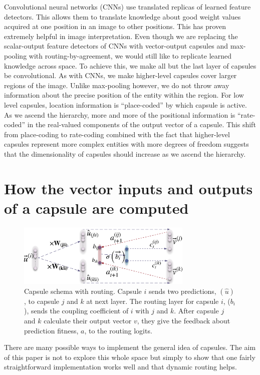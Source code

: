 \documentclass{article}
\begin{document}
Convolutional neural networks (CNNs) use translated replicas of learned feature detectors. This allows them to translate knowledge about good weight values acquired at one position in an image to other positions.  This has proven extremely helpful in image interpretation.  Even though we are replacing the scalar-output feature detectors of CNNs with vector-output capsules and max-pooling with routing-by-agreement, we would still like to replicate learned knowledge across space. To achieve this, we make all but the last layer of capsules be convolutional. As with CNNs, we make higher-level capsules cover larger regions of the image. Unlike max-pooling however, we do not throw away information about the precise position of the entity within the region.  For low level capsules, location information is ``place-coded'' by which capsule is active.  As we ascend the hierarchy, more and more of the positional information is ``rate-coded'' in the real-valued components of the output vector of a capsule. This shift from place-coding to rate-coding combined with the fact that higher-level capsules represent more complex entities with more degrees of freedom suggests that the dimensionality of capsules should increase as we ascend the hierarchy. 

\section{How the vector inputs and outputs of a capsule are computed}
\begin{figure}[t]

  \caption{Capsule schema with routing. Capsule $i$ sends two predictions, $(\hat{u})$, to capsule $j$ and $k$ at next layer. The routing layer for capsule $i$, ($b_i$), sends the coupling coefficient of $i$ with $j$ and $k$. After capsule $j$ and $k$ calculate their output vector $v$, they give the feedback about prediction fitness, $a$, to the routing logits.}
  \label{routing}
  \centering
    \includegraphics[height=3cm]{capsRouting}
\end{figure}
There are many possible ways to implement the general idea of capsules. The aim of this paper is not to explore this whole space but simply to show that one fairly straightforward implementation works well and that dynamic routing helps.
\end{document}
